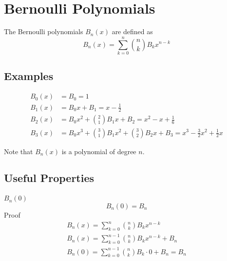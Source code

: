 \documentclass[a4paper]{article}
\begin{document}
\pagebreak


\section{Bernoulli Polynomials}\label{bn:sec:bernoulli-polynomials}
\begin{definition}
    \label{bn:bernoulli poly def}
    The Bernoulli polynomials $B_n(x)$ are defined as
    \[\boxed{
            B_{n}(x) = \sum_{k=0}^{n} \binom{n}{k} B_k x^{n-k}
        }\]
\end{definition}

\subsection{Examples}\label{bn:subsec:examples}
\begin{align*}
    B_{0}(x) & = B_0 = 1
    \\
    B_{1}(x) & = B_0 x + B_1 = x - \frac{1}{2}
    \\
    B_{2}(x) & = B_0 x^2 + \binom{2}{1} B_1 x + B_2 = x^2 - x +  \frac{1}{6}
    \\
    B_{3}(x) & = B_0 x^3 + \binom{3}{1} B_1 x^2 + \binom{3}{2} B_2 x + B_3 = x^3 - \frac{3}{2} x^2 +  \frac{1}{2} x
\end{align*}

Note that $B_n(x)$ is a polynomial of degree $n$.

\subsection{Useful Properties}\label{bn:subsec:useful-properties}
\begin{theorem}
    $B_n(0)$
    \begin{equation}
        \boxed{B_n(0) = B_n}\label{bn:eq:equation4}
    \end{equation}
    Proof
    \begin{gather*}
        B_n(x) = \sum_{k=0}^{n} \binom{n}{k} B_k x^{n-k}
        \\
        B_n(x) = \sum_{k=0}^{n-1} \binom{n}{k} B_k x^{n-k} + B_n
        \\
        B_n(0) = \sum_{k=0}^{n-1} \binom{n}{k} B_k \cdot 0 + B_n = B_n
    \end{gather*}
\end{theorem}
\end{document}
